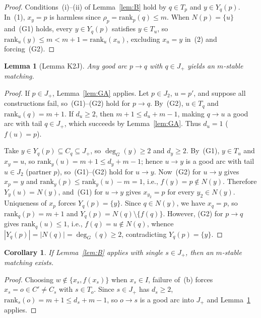 \documentclass[11pt]{article}
\newtheorem{lemma}[theorem]{Lemma}
\newtheorem{corollary}[theorem]{Corollary}
\begin{document}
\begin{proof}
Conditions~(i)--(ii) of Lemma~\ref{lem:B} hold by $q \in T_p$ and $y \in Y_q(p)$. In~(1), $x_y = p$ is harmless since $\rho_p = \mathrm{rank}_p(q) \le m$. When $N(p) = \{u\}$ and~(G1) holds, every $y \in Y_q(p)$ satisfies $y \in T_u$, so $\mathrm{rank}_u(y) \le m < m+1 = \mathrm{rank}_u(x_u)$, excluding $x_u = y$ in~(2) and forcing~(G2).
\end{proof}

\begin{lemma}[Lemma K2J]\label{lem:K2J}
Any good arc $p \to q$ with $q \in J_+$ yields an $m$-stable matching.
\end{lemma}

\begin{proof}
If $p \in J_+$, Lemma~\ref{lem:GA} applies. Let $p \in J_2$, $u = p'$, and suppose all constructions fail, so~(G1)--(G2) hold for $p \to q$. By~(G2), $u \in T_q$ and $\mathrm{rank}_u(q) = m+1$. If $d_u \ge 2$, then $m+1 \le d_u + m - 1$, making $q \to u$ a good arc with tail $q \in J_+$, which succeeds by Lemma~\ref{lem:GA}. Thus $d_u = 1$ ($f(u) = p$).

Take $y \in Y_q(p) \subseteq C_q \subseteq J_+$, so $\deg_G(y) \ge 2$ and $d_y \ge 2$. By~(G1), $y \in T_u$ and $x_y = u$, so $\mathrm{rank}_y(u) = m+1 \le d_y + m - 1$; hence $u \to y$ is a good arc with tail $u \in J_2$ (partner $p$), so~(G1)--(G2) hold for $u \to y$. Now~(G2) for $u \to y$ gives $x_p = y$ and $\mathrm{rank}_y(p) \le \mathrm{rank}_y(u) - m = 1$, i.e., $f(y) = p \notin N(y)$. Therefore $Y_y(u) = N(y)$, and~(G1) for $u \to y$ gives $x_{y_2} = p$ for every $y_2 \in N(y)$. Uniqueness of $x_p$ forces $Y_q(p) = \{y\}$. Since $q \in N(y)$, we have $x_q = p$, so $\mathrm{rank}_q(p) = m+1$ and $Y_q(p) = N(q) \setminus \{f(q)\}$. However, (G2) for $p \to q$ gives $\mathrm{rank}_q(u) \le 1$, i.e., $f(q) = u \notin N(q)$, whence $|Y_q(p)| = |N(q)| = \deg_G(q) \ge 2$, contradicting $Y_q(p) = \{y\}$.
\end{proof}

\begin{corollary}\label{cor:S}
If Lemma~\ref{lem:B} applies with single $s \in J_+$, then an $m$-stable matching exists.
\end{corollary}

\begin{proof}
Choosing $w \notin \{x_s, f(x_s)\}$ when $x_s \in I$, failure of~(b) forces $x_s = o \in C' \neq C_s$ with $s \in T_o$. Since $s \in J_+$ has $d_s \ge 2$, $\mathrm{rank}_s(o) = m+1 \le d_s + m - 1$, so $o \to s$ is a good arc into $J_+$ and Lemma~\ref{lem:K2J} applies.
\end{proof}
\end{document}
